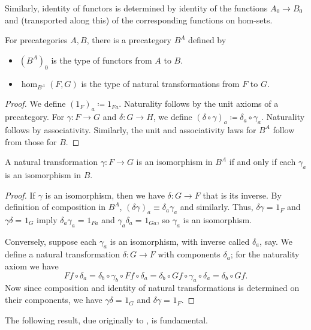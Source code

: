 \documentclass{mscs}
\newcommand{\jdeq}{\equiv}      %
\newcommand{\defeq}{\coloneqq}  %
\newcommand{\id}[3][]{\ensuremath{#2 =_{#1} #3}\xspace}
\numberwithin{equation}{section}
\begin{document}
Similarly, identity of functors is determined by identity of the functions $A_0\to B_0$ and (transported along this) of the corresponding functions on hom-sets.

\begin{defn}\label{ct:functor-precat}
  For precategories $A,B$, there is a precategory $B^A$ defined by
  \begin{itemize}
  \item $(B^A)_0$ is the type of functors from $A$ to $B$.
  \item $\hom_{B^A}(F,G)$ is the type of natural transformations from $F$ to $G$.
  \end{itemize}
\end{defn}
\begin{proof}
  We define $(1_F)_a\defeq 1_{Fa}$.
  Naturality follows by the unit axioms of a precategory.
  For $\gamma:F\to G$ and $\delta:G\to H$, we define $(\delta\circ\gamma)_a\defeq \delta_a\circ \gamma_a$.
  Naturality follows by associativity.
  Similarly, the unit and associativity laws for $B^A$ follow from those for $B$.
\end{proof}

\begin{lem}\label{ct:natiso}
  A natural transformation $\gamma:F\to G$ is an isomorphism in $B^A$ if and only if each $\gamma_a$ is an isomorphism in $B$.
\end{lem}
\begin{proof}
  If $\gamma$ is an isomorphism, then we have $\delta:G\to F$ that is its inverse.
  By definition of composition in $B^A$, $(\delta\gamma)_a\jdeq \delta_a\gamma_a$ and similarly.
  Thus, $\id{\delta\gamma}{1_F}$ and $\id{\gamma\delta}{1_G}$ imply $\id{\delta_a\gamma_a}{1_{Fa}}$ and $\id{\gamma_a\delta_a}{1_{Ga}}$, so $\gamma_a$ is an isomorphism.

  Conversely, suppose each $\gamma_a$ is an isomorphism, with inverse called $\delta_a$, say.
We define a natural transformation $\delta:G\to F$ with components $\delta_a$; for the naturality axiom we have
  \[ Ff\circ \delta_a = \delta_b\circ \gamma_b\circ Ff \circ \delta_a = \delta_b\circ Gf\circ \gamma_a\circ \delta_a = \delta_b\circ Gf. \]
  Now since composition and identity of natural transformations is determined on their components, we have $\id{\gamma\delta}{1_G}$ and $\id{\delta\gamma}{1_F}$.
\end{proof}

The following result, due originally to \textcite{hs:gpd-typethy}, is fundamental.
\end{document}
